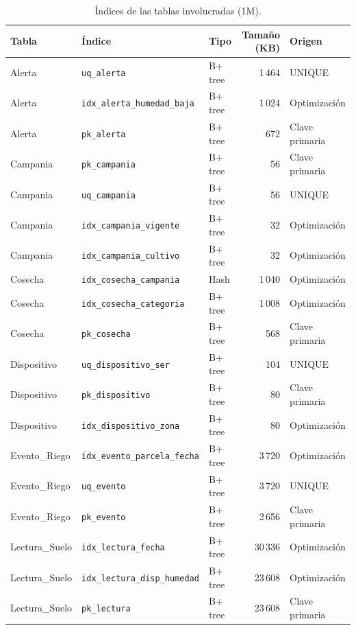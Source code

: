 \documentclass[11pt,letterpaper]{article}
\begin{document}
\begin{table}[H]
\centering\small
\begin{tabular}{lllrl}
\toprule
Tabla & Índice & Tipo & Tamaño (KB) & Origen \\
\midrule
Alerta & \texttt{uq\_alerta} & B+ tree & 1\,464 & UNIQUE \\
Alerta & \texttt{idx\_alerta\_humedad\_baja} & B+ tree & 1\,024 & Optimización \\
Alerta & \texttt{pk\_alerta} & B+ tree & 672 & Clave primaria \\
Campania & \texttt{pk\_campania} & B+ tree & 56 & Clave primaria \\
Campania & \texttt{uq\_campania} & B+ tree & 56 & UNIQUE \\
Campania & \texttt{idx\_campania\_vigente} & B+ tree & 32 & Optimización \\
Campania & \texttt{idx\_campania\_cultivo} & B+ tree & 32 & Optimización \\
Cosecha & \texttt{idx\_cosecha\_campania} & Hash & 1\,040 & Optimización \\
Cosecha & \texttt{idx\_cosecha\_categoria} & B+ tree & 1\,008 & Optimización \\
Cosecha & \texttt{pk\_cosecha} & B+ tree & 568 & Clave primaria \\
Dispositivo & \texttt{uq\_dispositivo\_ser} & B+ tree & 104 & UNIQUE \\
Dispositivo & \texttt{pk\_dispositivo} & B+ tree & 80 & Clave primaria \\
Dispositivo & \texttt{idx\_dispositivo\_zona} & B+ tree & 80 & Optimización \\
Evento\_Riego & \texttt{idx\_evento\_parcela\_fecha} & B+ tree & 3\,720 & Optimización \\
Evento\_Riego & \texttt{uq\_evento} & B+ tree & 3\,720 & UNIQUE \\
Evento\_Riego & \texttt{pk\_evento} & B+ tree & 2\,656 & Clave primaria \\
Lectura\_Suelo & \texttt{idx\_lectura\_fecha} & B+ tree & 30\,336 & Optimización \\
Lectura\_Suelo & \texttt{idx\_lectura\_disp\_humedad} & B+ tree & 23\,608 & Optimización \\
Lectura\_Suelo & \texttt{pk\_lectura} & B+ tree & 23\,608 & Clave primaria \\
\bottomrule
\end{tabular}
\caption{Índices de las tablas involucradas (1M).}\label{tab:tamidx}
\end{table}
\end{document}
